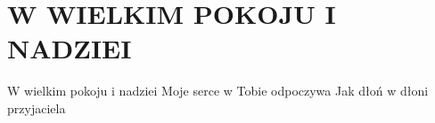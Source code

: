 \documentclass[../../../songbook.tex]{subfiles}
\begin{document}
\TabPositions{8cm} %
\section*{W WIELKIM POKOJU I NADZIEI}
{}
\vspace{0.5cm}
W wielkim pokoju i nadziei		 \newline
Moje serce w Tobie odpoczywa	 \newline
Jak dłoń w dłoni przyjaciela	 \newline
\end{document}
